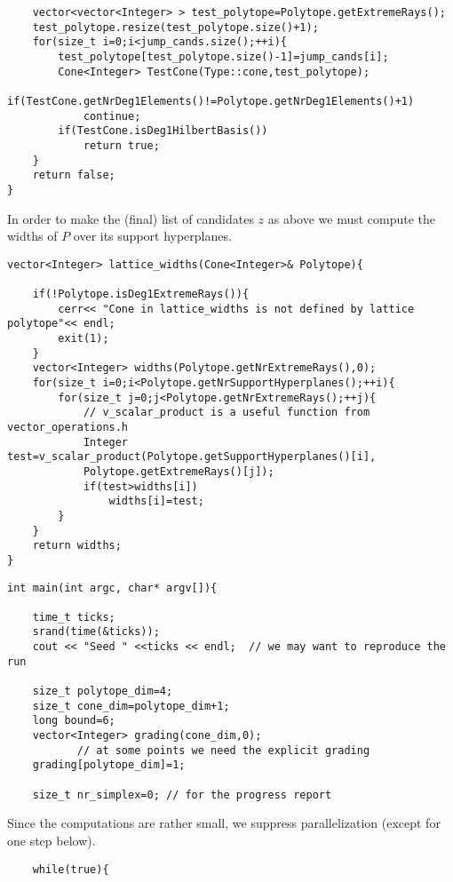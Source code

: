 \begin{small}
\begin{Verbatim}
    vector<vector<Integer> > test_polytope=Polytope.getExtremeRays();
    test_polytope.resize(test_polytope.size()+1); 
    for(size_t i=0;i<jump_cands.size();++i){
        test_polytope[test_polytope.size()-1]=jump_cands[i];
        Cone<Integer> TestCone(Type::cone,test_polytope);
        if(TestCone.getNrDeg1Elements()!=Polytope.getNrDeg1Elements()+1)
            continue;
        if(TestCone.isDeg1HilbertBasis())
            return true;
    }
    return false;
}
\end{Verbatim}

In order to make the (final) list of candidates $z$ as above we must compute the widths of $P$ over its support hyperplanes.
\begin{Verbatim}
vector<Integer> lattice_widths(Cone<Integer>& Polytope){

    if(!Polytope.isDeg1ExtremeRays()){
        cerr<< "Cone in lattice_widths is not defined by lattice polytope"<< endl;
        exit(1);
    }
    vector<Integer> widths(Polytope.getNrExtremeRays(),0);
    for(size_t i=0;i<Polytope.getNrSupportHyperplanes();++i){
        for(size_t j=0;j<Polytope.getNrExtremeRays();++j){
            // v_scalar_product is a useful function from vector_operations.h
            Integer test=v_scalar_product(Polytope.getSupportHyperplanes()[i],
            Polytope.getExtremeRays()[j]);
            if(test>widths[i])
                widths[i]=test;
        }
    }
    return widths;
}
\end{Verbatim}

\begin{Verbatim}
int main(int argc, char* argv[]){

    time_t ticks;
    srand(time(&ticks));
    cout << "Seed " <<ticks << endl;  // we may want to reproduce the run

    size_t polytope_dim=4;
    size_t cone_dim=polytope_dim+1;
    long bound=6;
    vector<Integer> grading(cone_dim,0); 
           // at some points we need the explicit grading
    grading[polytope_dim]=1;

    size_t nr_simplex=0; // for the progress report
\end{Verbatim}
Since the computations are rather small, we suppress parallelization (except for one step below).
\begin{Verbatim}
    while(true){


\end{Verbatim}
\end{small}
